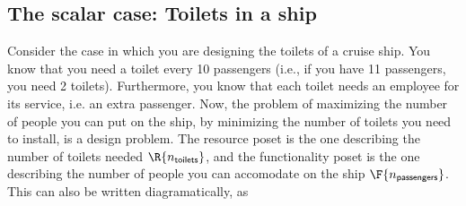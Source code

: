 \subsection{The scalar case: Toilets in a ship}
Consider the case in which you are designing the toilets of a cruise ship. You know that you need a toilet every 10 passengers (i.e., if you have 11 passengers, you need 2 toilets). Furthermore, you know that each toilet needs an employee for its service, i.e. an extra passenger. Now, the problem of maximizing the number of people you can put on the ship, by minimizing the number of toilets you need to install, is a design problem. The resource poset is the one describing the number of toilets needed $\R{n_\mathsf{toilets}}$, and the functionality poset is the one describing the number of people you can accomodate on the ship $\F{n_\mathsf{passengers}}$. 
This can also be written diagramatically, as
\begin{center}
\end{center}

